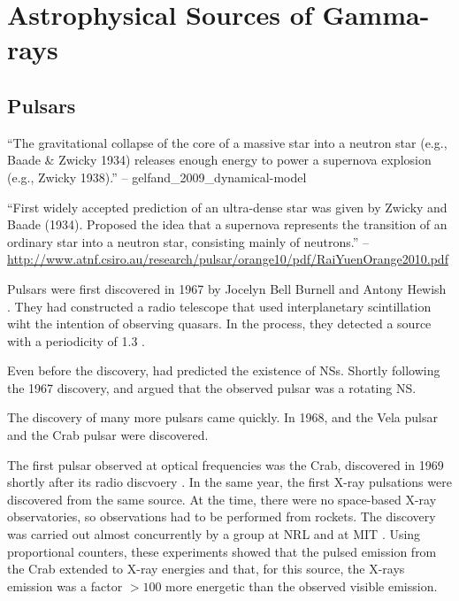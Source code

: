 \section{Astrophysical Sources of Gamma-rays}

\subsection{Pulsars}

``The gravitational collapse of the core of a massive star into a neutron
star (e.g., Baade \& Zwicky 1934) releases enough energy to power a
supernova explosion (e.g., Zwicky 1938).'' -- gelfand\_2009\_dynamical-model

``First widely accepted prediction of an ultra-dense star
was given by Zwicky and Baade (1934). Proposed the idea that
a supernova represents the transition of an ordinary star
into a neutron star, consisting mainly of neutrons.'' --
\url{http://www.atnf.csiro.au/research/pulsar/orange10/pdf/RaiYuenOrange2010.pdf}


Pulsars were first discovered in 1967 by Jocelyn Bell Burnell and Antony
Hewish \citep{hewish_1968_observation-rapidly}. They had constructed a
radio telescope that used interplanetary scintillation wiht the intention
of observing quasars.  In the process, they detected a source with a
periodicity of 1.3 \second.


Even before the discovery, \cite{pacini_1967_energy-emission} had predicted
the existence of \acp{NS}.  Shortly following the 1967 discovery,
\cite{gold_1968_rotating-neutron} and \cite{pacini_1968_rotating-neutron}
argued that the observed pulsar was a rotating \ac{NS}.

The discovery of many more pulsars came quickly.  In 1968, and the
Vela pulsar \citep{large_1968_pulsar-supernova} and the Crab pulsar
\citep{staelin_1968_pulsating-radio} were discovered.

The first pulsar observed at optical frequencies was the
Crab, discovered in 1969 shortly after its radio discvoery
\citep{cocke_1969_discovery-optical}.
In the same year, the first X-ray pulsations were discovered from
the same source. At the time, there were no space-based X-ray
observatories, so observations had to be performed from rockets.
The discovery was carried out almost concurrently by a group
at \gls{NRL} \citep{fritz_1969_x-ray-pulsar} and at \gls{MIT}
\citep{bradt_1969_x-ray-optical}.  Using proportional counters,
these experiments showed that the pulsed emission from 
the Crab extended to X-ray energies and that, for this source,
the X-rays emission was a factor $>100$ more energetic than
the observed visible emission.

